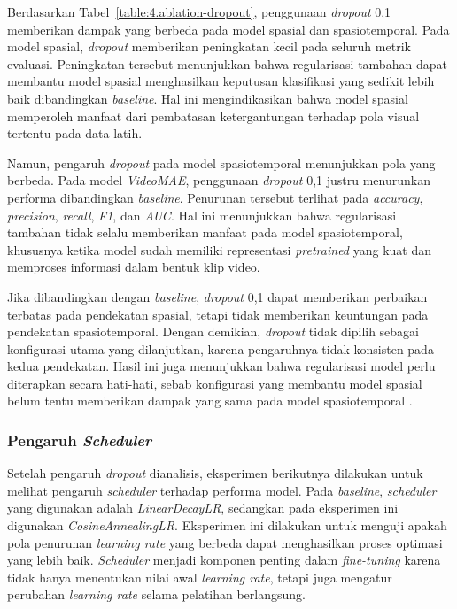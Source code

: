 Berdasarkan Tabel~\ref{table:4.ablation-dropout}, penggunaan \textit{dropout} 0,1 memberikan dampak yang berbeda pada model spasial dan spasiotemporal. Pada model spasial, \textit{dropout} memberikan peningkatan kecil pada seluruh metrik evaluasi. Peningkatan tersebut menunjukkan bahwa regularisasi tambahan dapat membantu model spasial menghasilkan keputusan klasifikasi yang sedikit lebih baik dibandingkan \textit{baseline}. Hal ini mengindikasikan bahwa model spasial memperoleh manfaat dari pembatasan ketergantungan terhadap pola visual tertentu pada data latih.

Namun, pengaruh \textit{dropout} pada model spasiotemporal menunjukkan pola yang berbeda. Pada model \textit{VideoMAE}, penggunaan \textit{dropout} 0,1 justru menurunkan performa dibandingkan \textit{baseline}. Penurunan tersebut terlihat pada \textit{accuracy}, \textit{precision}, \textit{recall}, \textit{F1}, dan \textit{AUC}. Hal ini menunjukkan bahwa regularisasi tambahan tidak selalu memberikan manfaat pada model spasiotemporal, khususnya ketika model sudah memiliki representasi \textit{pretrained} yang kuat dan memproses informasi dalam bentuk klip video.

Jika dibandingkan dengan \textit{baseline}, \textit{dropout} 0,1 dapat memberikan perbaikan terbatas pada pendekatan spasial, tetapi tidak memberikan keuntungan pada pendekatan spasiotemporal. Dengan demikian, \textit{dropout} tidak dipilih sebagai konfigurasi utama yang dilanjutkan, karena pengaruhnya tidak konsisten pada kedua pendekatan. Hasil ini juga menunjukkan bahwa regularisasi model perlu diterapkan secara hati-hati, sebab konfigurasi yang membantu model spasial belum tentu memberikan dampak yang sama pada model spasiotemporal \cite{JMLR:v15:srivastava14a}.

\subsubsection{Pengaruh \textit{Scheduler}} \label{IV.Eksperimen_Ablation_Scheduler}
Setelah pengaruh \textit{dropout} dianalisis, eksperimen berikutnya dilakukan untuk melihat pengaruh \textit{scheduler} terhadap performa model. Pada \textit{baseline}, \textit{scheduler} yang digunakan adalah \textit{LinearDecayLR}, sedangkan pada eksperimen ini digunakan \textit{CosineAnnealingLR}. Eksperimen ini dilakukan untuk menguji apakah pola penurunan \textit{learning rate} yang berbeda dapat menghasilkan proses optimasi yang lebih baik. \textit{Scheduler} menjadi komponen penting dalam \textit{fine-tuning} karena tidak hanya menentukan nilai awal \textit{learning rate}, tetapi juga mengatur perubahan \textit{learning rate} selama pelatihan berlangsung.

